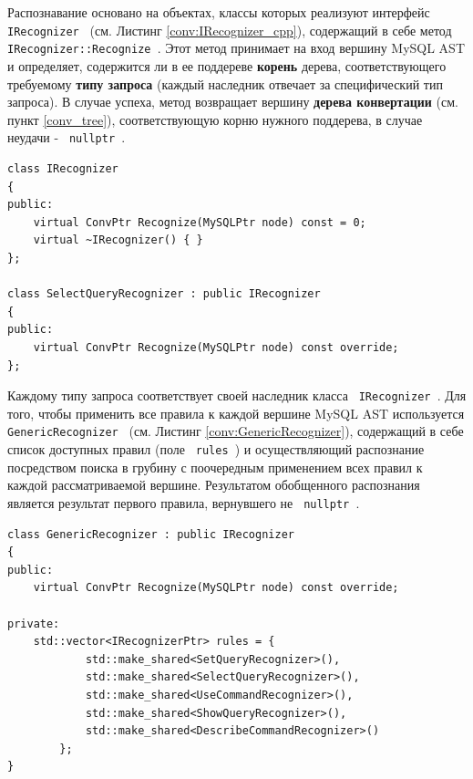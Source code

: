 Распознавание основано на объектах, классы которых реализуют интерфейс \texttt{ IRecognizer } (см. Листинг \ref{conv:IRecognizer_cpp}), содержащий в себе метод \texttt{ IRecognizer::Recognize }. Этот метод принимает на вход вершину MySQL AST и определяет, содержится ли в ее поддереве \textbf{корень} дерева, соответствующего требуемому \textbf{типу запроса} (каждый наследник отвечает за специфический тип запроса). В случае успеха, метод возвращает вершину \textbf{дерева конвертации} (см. пункт \ref{conv_tree}), соответствующую корню нужного поддерева, в случае неудачи - \texttt{ nullptr }.

\begin{code}
    \label{conv:IRecognizer_cpp}
    \begin{verbatim}
class IRecognizer
{
public:
    virtual ConvPtr Recognize(MySQLPtr node) const = 0;
    virtual ~IRecognizer() { }
};

class SelectQueryRecognizer : public IRecognizer
{
public:
    virtual ConvPtr Recognize(MySQLPtr node) const override;
};
    \end{verbatim}
\end{code}

Каждому типу запроса соответствует своей наследник класса \texttt{ IRecognizer }. Для того, чтобы применить все правила к каждой вершине MySQL AST используется \texttt{ GenericRecognizer } (см. Листинг \ref{conv:GenericRecognizer}), содержащий в себе список доступных правил (поле \texttt{ rules }) и осуществляющий распознание посредством поиска в грубину с поочередным применением всех правил к каждой рассматриваемой вершине. Результатом обобщенного распознания является результат первого правила, вернувшего не \texttt{ nullptr }. 

\begin{code}
    \label{conv:GenericRecognizer}
    \begin{verbatim}
class GenericRecognizer : public IRecognizer
{
public:
    virtual ConvPtr Recognize(MySQLPtr node) const override;

private:
    std::vector<IRecognizerPtr> rules = {
            std::make_shared<SetQueryRecognizer>(),
            std::make_shared<SelectQueryRecognizer>(),
            std::make_shared<UseCommandRecognizer>(),
            std::make_shared<ShowQueryRecognizer>(),
            std::make_shared<DescribeCommandRecognizer>()
        };
}
    \end{verbatim}
\end{code}

